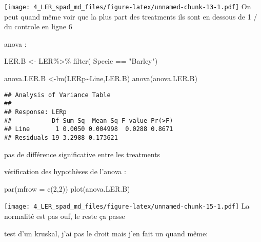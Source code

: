 \documentclass[
]{article}
\newenvironment{Shaded}{\begin{snugshade}}{\end{snugshade}}
\newcommand{\AttributeTok}[1]{\textcolor[rgb]{0.77,0.63,0.00}{#1}}
\newcommand{\DecValTok}[1]{\textcolor[rgb]{0.00,0.00,0.81}{#1}}
\newcommand{\FunctionTok}[1]{\textcolor[rgb]{0.00,0.00,0.00}{#1}}
\newcommand{\NormalTok}[1]{#1}
\newcommand{\OtherTok}[1]{\textcolor[rgb]{0.56,0.35,0.01}{#1}}
\newcommand{\SpecialCharTok}[1]{\textcolor[rgb]{0.00,0.00,0.00}{#1}}
\newcommand{\StringTok}[1]{\textcolor[rgb]{0.31,0.60,0.02}{#1}}
\begin{document}
\texttt{[image: 4\_LER\_spad\_md\_files/figure-latex/unnamed-chunk-13-1.pdf]}
On peut quand même voir que la plus part des treatments ils sont en
dessous de 1 / du controle en ligne 6

anova :

\begin{Shaded}
\begin{Highlighting}[]
\NormalTok{LER.B }\OtherTok{\textless{}{-}}\NormalTok{ LER}\SpecialCharTok{\%\textgreater{}\%}
  \FunctionTok{filter}\NormalTok{( Specie }\SpecialCharTok{==} \StringTok{"Barley"}\NormalTok{)}

\NormalTok{anova.LER.B }\OtherTok{\textless{}{-}}\FunctionTok{lm}\NormalTok{(LERp}\SpecialCharTok{\textasciitilde{}}\NormalTok{Line,LER.B)}
\FunctionTok{anova}\NormalTok{(anova.LER.B)}
\end{Highlighting}
\end{Shaded}

\begin{verbatim}
## Analysis of Variance Table
## 
## Response: LERp
##           Df Sum Sq  Mean Sq F value Pr(>F)
## Line       1 0.0050 0.004998  0.0288 0.8671
## Residuals 19 3.2988 0.173621
\end{verbatim}

pas de différence significative entre les treatments

vérification des hypothèses de l'anova :

\begin{Shaded}
\begin{Highlighting}[]
\FunctionTok{par}\NormalTok{(}\AttributeTok{mfrow =} \FunctionTok{c}\NormalTok{(}\DecValTok{2}\NormalTok{,}\DecValTok{2}\NormalTok{))}
\FunctionTok{plot}\NormalTok{(anova.LER.B)}
\end{Highlighting}
\end{Shaded}

\texttt{[image: 4\_LER\_spad\_md\_files/figure-latex/unnamed-chunk-15-1.pdf]}
La normalité est pas ouf, le reste ça passe

test d'un kruskal, j'ai pas le droit mais j'en fait un quand même:

\begin{Shaded}
\end{Shaded}
\end{document}
